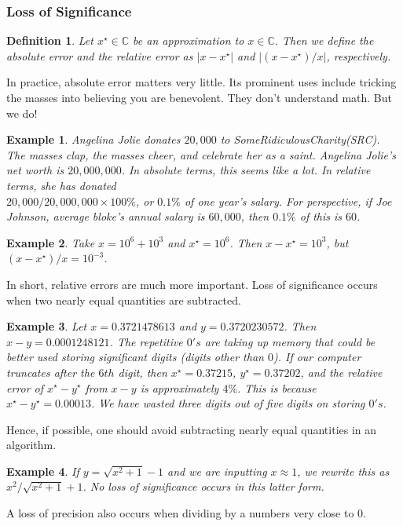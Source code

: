 \documentclass[12pt,reqno]{amsart}
\numberwithin{equation}{section}  %
\newcommand{\cc}{\mathbb{C}}
\newtheorem{definition}[theorem]{Definition}
\newtheorem{example}{Example}[section]
\begin{document}
\subsubsection{Loss of Significance}
\begin{definition}
Let $x^\star \in \cc$ be an approximation to $x \in \cc$. Then we define
the \emph{absolute error} and the \emph{relative error} as $|x - x^\star|$
and $|(x - x^\star)/x|$, respectively.
\end{definition}
In practice, absolute error matters very little. Its prominent uses
include tricking the masses into believing you are benevolent. They don't understand
math. But we do!
\begin{example}
Angelina Jolie donates $20,000$ to SomeRidiculousCharity(SRC). The masses clap,
the masses cheer, and celebrate her as a saint. Angelina Jolie's net
worth is $20,000,000$. In absolute terms, this seems like a lot. In relative
terms, she has donated \\ $20,000/20,000,000 \times 100 \%$, or $0.1 \%$ of
one year's salary. For perspective, if Joe Johnson, average bloke's 
annual salary is $60,000$, then $0.1 \%$ of this is $60$.
\end{example}
\begin{example}
Take $x = 10^6 + 10^3$ and $x^\star = 10^6$. Then $x - x^\star = 10^3$,
but $(x - x^\star)/x = 10^{-3}$.
\end{example}
In short, relative errors are much more important. 
Loss of significance occurs when two nearly equal quantities are subtracted.
\begin{example}
Let $x = 0.3721478613$ and $y = 0.3720230572$. Then $x-y = 0.0001248121$.
The repetitive $0's$ are taking up memory that could be better used storing
significant digits (digits other than $0$). If our computer truncates
after the $6th$ digit, then
$x^\star = 0.37215$, $y^\star = 0.37202$, and the relative error
of $x^\star-y^\star$ from $x-y$ is approximately $4\%$. This is because
$x^\star - y^\star = 0.00013$. We have wasted three digits out of
five digits on storing $0's$.
\end{example}
Hence, if possible, one should avoid subtracting nearly equal quantities
in an algorithm.
\begin{example}
If $y = \sqrt{x^2 + 1} -1$ and we are inputting $x \approx 1$, we rewrite this as $x^2/\sqrt{x^2 + 1} + 1$.
No loss of significance occurs in this latter form.
\end{example}
A loss of precision also occurs when dividing by a numbers very close to $0$.
\end{document}

